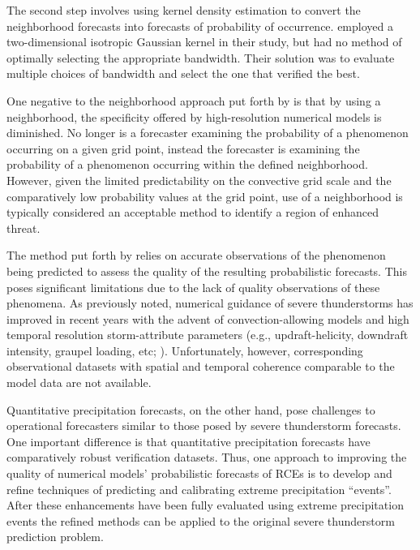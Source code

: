 The second step involves using kernel density estimation to convert the neighborhood forecasts into forecasts of probability of occurrence.
\cite{Sobash2011} employed a two-dimensional isotropic Gaussian kernel in their study, but had no method of optimally selecting the appropriate bandwidth.
Their solution was to evaluate multiple choices of bandwidth and select the one that verified the best.


One negative to the neighborhood approach put forth by \cite{Sobash2011} is that by using a neighborhood, the specificity offered by high-resolution numerical models is diminished.
No longer is a forecaster examining the probability of a phenomenon occurring on a given grid point, instead the forecaster is examining the probability of a phenomenon occurring within the defined neighborhood.
However, given the limited predictability on the convective grid scale and the comparatively low probability values at the grid point, use of a neighborhood is typically considered an acceptable method to identify a region of enhanced threat.


The method put forth by \cite{Sobash2011} relies on accurate observations of the phenomenon being predicted to assess the quality of the resulting probabilistic forecasts.
This poses significant limitations due to the lack of quality observations of these phenomena.
As previously noted, numerical guidance of severe thunderstorms has improved in recent years with the advent of convection-allowing models and high temporal resolution storm-attribute parameters (e.g., updraft-helicity, downdraft intensity, graupel loading, etc; \citealp{Kain2010}).
Unfortunately, however, corresponding observational datasets with spatial and temporal coherence comparable to the model data are not available.


Quantitative precipitation forecasts, on the other hand, pose challenges to operational forecasters similar to those posed by severe thunderstorm forecasts.
One important difference is that quantitative precipitation forecasts have comparatively robust verification datasets.
Thus, one approach to improving the quality of numerical models' probabilistic forecasts of RCEs is to develop and refine techniques of predicting and calibrating extreme precipitation ``events''.
After these enhancements have been fully evaluated using extreme precipitation events the refined methods can be applied to the original severe thunderstorm prediction problem.



